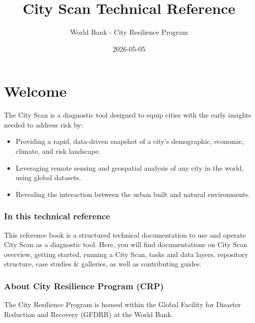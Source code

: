 \documentclass[
  letterpaper,
  DIV=11,
  numbers=noendperiod]{scrreprt}
\title{City Scan Technical Reference}
\author{World Bank - City Resilience Program}
\date{2026-05-05}
\providecommand{\tightlist}{%
  \setlength{\itemsep}{0pt}\setlength{\parskip}{0pt}}
\renewcommand*\contentsname{Table of contents}
\newcommand\contentsname{Table of contents}
\begin{document}
\maketitle

\renewcommand*\contentsname{Table of contents}
{
\setcounter{tocdepth}{2}
\tableofcontents
}


\chapter*{Welcome}\label{welcome}


The City Scan is a diagnostic tool designed to equip cities with the
early insights needed to address risk by:

\begin{itemize}
\tightlist
\item
  Providing a rapid, data-driven snapshot of a city's demographic,
  economic, climate, and risk landscape.
\item
  Leveraging remote sensing and geospatial analysis of any city in the
  world, using global datasets.
\item
  Revealing the interaction between the urban built and natural
  environments.
\end{itemize}

\subsection*{In this technical
reference}\label{in-this-technical-reference}

This reference book is a structured technical documentation to use and
operate City Scan as a diagnostic tool. Here, you will find
documentations on City Scan overview, getting started, running a City
Scan, tasks and data layers, repository structure, case studies \&
galleries, as well as contributing guides.

\subsection*{About City Resilience Program
(CRP)}\label{about-city-resilience-program-crp}

The City Resilience Program is housed within the Global Facility for
Disaster Reduction and Recovery (GFDRR) at the World Bank.
\end{document}
